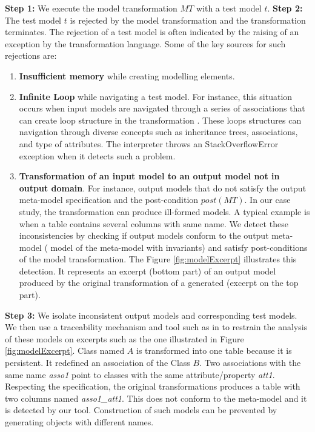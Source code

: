 \noindent \textbf{Step 1:}  We execute the model transformation $MT$ with a test model $t$. 
\noindent \textbf{Step 2:}  The test model $t$ is rejected by the model transformation and the transformation terminates. The rejection of  a test model is often indicated by the raising of an exception by the transformation language. Some of the key sources for such rejections are:
					\begin{enumerate}
							\item \textbf{Insufficient memory} while creating modelling elements.
							\item \textbf{Infinite Loop} while navigating a test model.  For instance, this situation occurs when input models are navigated through a series of associations that can create loop structure in the transformation {\transfo}. These loops structures can navigation through diverse concepts such as  inheritance trees, associations, and type of attributes. The {\Kermeta} interpreter throws an  \textsf{StackOverflowError} exception when it detects such a problem. 
							\item \textbf{Transformation of an input model to an output model not in output domain}.  For instance, output models that do not satisfy the output meta-model specification and the post-condition $post(MT)$. In our case study, the transformation {\transfo} can produce ill-formed {\RDBMS} models. A typical example is when a table contains several columns with same name. We detect these inconsistencies by checking if output models conform to the output meta-model ({\ecore} model of the meta-model with invariants) and satisfy post-conditions of the model transformation. The Figure \ref{fig:modelExcerpt} illustrates this detection. It represents an excerpt (bottom part) of an output model produced by the original transformation of a generated (excerpt on the top part). 
					\end{enumerate}
					
\noindent \textbf{Step 3:}  We isolate inconsistent output models and corresponding test models. We then use a traceability mechanism and tool such as in \cite{glitia2008} to restrain the analysis of these models on excerpts such as the one illustrated in Figure \ref{fig:modelExcerpt}. Class named $A$ is transformed into one table because it is persistent. It redefined an association of the Class $B$. Two associations with the same name \emph{asso1} point  to classes with the same attribute/property \emph{att1}. Respecting the specification, the original transformations produces a table with two columns named \emph{asso1\_att1}. This does not conform to the {\RDBMS} meta-model and it is detected by our tool. Construction of such models can be prevented by generating objects with different names. 

